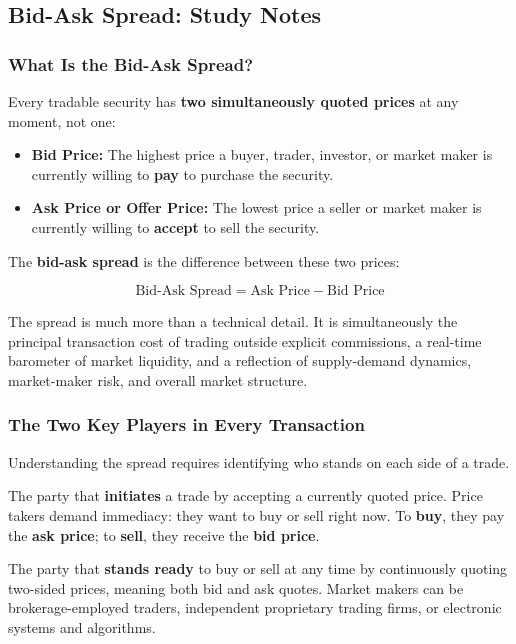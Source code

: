 \documentclass[12pt,openany]{book}
\begin{document}
\subsection{Bid-Ask Spread: Study Notes}

\subsubsection{What Is the Bid-Ask Spread?}
Every tradable security has \textbf{two simultaneously quoted prices} at any moment, not one:

\begin{itemize}[leftmargin=*]
    \item \textbf{Bid Price:} The highest price a buyer, trader, investor, or market maker is currently willing to \textbf{pay} to purchase the security.
    \item \textbf{Ask Price or Offer Price:} The lowest price a seller or market maker is currently willing to \textbf{accept} to sell the security.
\end{itemize}

The \textbf{bid-ask spread} is the difference between these two prices:

\begin{equation*}
    \boxed{\text{Bid-Ask Spread} = \text{Ask Price} - \text{Bid Price}}
\end{equation*}

The spread is much more than a technical detail. It is simultaneously the principal transaction cost of trading outside explicit commissions, a real-time barometer of market liquidity, and a reflection of supply-demand dynamics, market-maker risk, and overall market structure.

\subsubsection{The Two Key Players in Every Transaction}
Understanding the spread requires identifying who stands on each side of a trade.

\begin{description}[leftmargin=*,style=nextline]
    \item[Price Taker: Trader or Investor] The party that \textbf{initiates} a trade by accepting a currently quoted price. Price takers demand immediacy: they want to buy or sell right now. To \textbf{buy}, they pay the \textbf{ask price}; to \textbf{sell}, they receive the \textbf{bid price}.
    \item[Market Maker: Counterparty] The party that \textbf{stands ready} to buy or sell at any time by continuously quoting two-sided prices, meaning both bid and ask quotes. Market makers can be brokerage-employed traders, independent proprietary trading firms, or electronic systems and algorithms.
\end{description}
\end{document}
